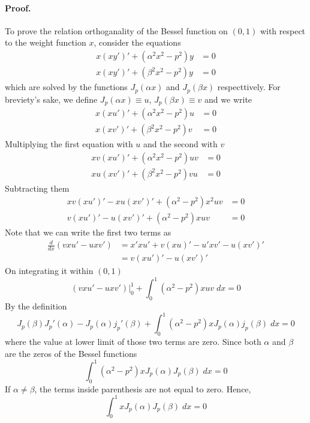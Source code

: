 \documentclass[../main.tex]{subfiles}
\begin{document}
\paragraph*{Proof.} To prove the relation orthoganality of the Bessel function on $(0,1)$ with respect to the weight function $x$, consider the equations 
\begin{align*}
    x(xy')'+(\alpha^2x^2-p^2)y&=0\\
    x(xy')'+(\beta^2x^2-p^2)y&=0
\end{align*}
which are solved by the functions $J_p(\alpha x)$ and $J_p(\beta x)$ respecttively. For breviety's sake, we define $J_p(\alpha x)\equiv u$,  $J_p(\beta x)\equiv v$ and we write
\begin{align*}
    x(xu')'+(\alpha^2x^2-p^2)u&=0\\
    x(xv')'+(\beta^2x^2-p^2)v&=0
\end{align*}
Multiplying the first equation with $u$ and the second with $v$
\begin{align*}
    xv(xu')'+(\alpha^2x^2-p^2)uv&=0\\
    xu(xv')'+(\beta^2x^2-p^2)vu&=0
\end{align*}
Subtracting them 
\begin{align*}
    xv(xu')'-xu(xv')'+(\alpha^2-p^2)x^2uv&=0\\
    v(xu')'-u(xv')'+(\alpha^2-p^2)xuv&=0
\end{align*}
Note that we can write the first two terms as
\begin{align*}
    \frac{d}{dx}\left(vxu'-uxv'\right)&=x'xu'+v(xu)'-u'xv'-u(xv')'\\
    &=v(xu')'-u(xv')'
\end{align*}
On integrating it within $(0,1)$
\begin{equation*}
    \left(vxu'-uxv'\right)\bigg|_0^1+\int_{0}^{1}(\alpha^2-p^2)xuv\;dx=0
\end{equation*}
By the definition
\begin{equation*}
    J_p(\beta)J_p'(\alpha) -J_p(\alpha)j_p'(\beta) +\int_{0}^{1}(\alpha^2-p^2)xJ_p(\alpha)j_p(\beta)\;dx=0
\end{equation*}
where the value at lower limit of those two terms are zero. Since both $\alpha$ and $\beta$ are the zeros of the Bessel functions
\begin{equation*}
    \int_{0}^{1}(\alpha^2-p^2)xJ_p(\alpha)J_p(\beta)\;dx=0
\end{equation*}
If $\alpha\neq\beta$, the terms inside parenthesis are not equal to zero. Hence,
\begin{equation*}
    \int_{0}^{1}xJ_p(\alpha)J_p(\beta)\;dx=0
\end{equation*}
\end{document}
